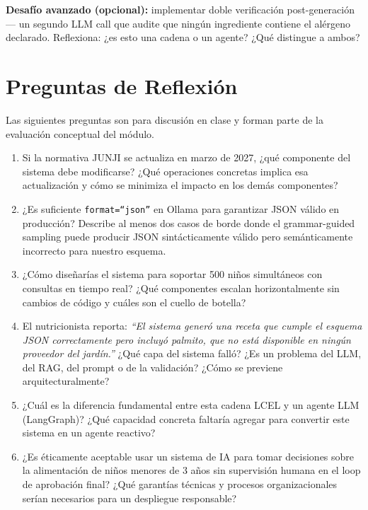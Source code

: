 \documentclass[12pt,a4paper]{article}
\begin{document}
\textbf{Desafío avanzado (opcional):} implementar doble verificación
post-generación --- un segundo LLM call que audite que ningún ingrediente
contiene el alérgeno declarado. Reflexiona: ¿es esto una cadena o un agente?
¿Qué distingue a ambos?

\section{Preguntas de Reflexión}
\label{sec:reflexion}

Las siguientes preguntas son para discusión en clase y forman parte
de la evaluación conceptual del módulo.

\begin{enumerate}
  \item Si la normativa JUNJI se actualiza en marzo de 2027, ¿qué
    componente del sistema debe modificarse? ¿Qué operaciones concretas
    implica esa actualización y cómo se minimiza el impacto en los demás
    componentes?

  \item ¿Es suficiente \texttt{format=``json''} en Ollama para garantizar
    JSON válido en producción? Describe al menos dos casos de borde donde
    el grammar-guided sampling puede producir JSON sintácticamente válido
    pero semánticamente incorrecto para nuestro esquema.

  \item ¿Cómo diseñarías el sistema para soportar 500 niños simultáneos
    con consultas en tiempo real? ¿Qué componentes escalan horizontalmente
    sin cambios de código y cuáles son el cuello de botella?

  \item El nutricionista reporta: \textit{``El sistema generó una receta
    que cumple el esquema JSON correctamente pero incluyó palmito, que no
    está disponible en ningún proveedor del jardín.''}
    ¿Qué capa del sistema falló? ¿Es un problema del LLM, del RAG, del
    prompt o de la validación? ¿Cómo se previene arquitecturalmente?

  \item ¿Cuál es la diferencia fundamental entre esta cadena LCEL y un
    agente LLM (LangGraph)? ¿Qué capacidad concreta faltaría agregar para
    convertir este sistema en un agente reactivo?

  \item ¿Es éticamente aceptable usar un sistema de IA para tomar decisiones
    sobre la alimentación de niños menores de 3 años sin supervisión humana
    en el loop de aprobación final? ¿Qué garantías técnicas y procesos
    organizacionales serían necesarios para un despliegue responsable?
\end{enumerate}
\end{document}
